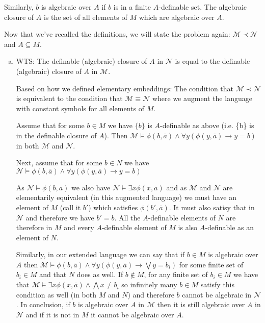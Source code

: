\documentclass[10pt]{article}
\newcommand{\A}{\forall}
\newcommand{\mcM}{\mathcal{M}}
\newcommand{\mcN}{\mathcal{N}}
\newcommand{\E}{\exists}
\begin{document}
\begin{enumerate}[1.]
Similarly, \(b\) is algebraic over \(A\) if \(b\) is in a finite \(A\)-definable set. 
The algebraic closure of \(A\) is the set of all elements of \(M\) which are algebraic over \(A\).

Now that we've recalled the definitions, we will state the problem again: 
\(\mcM \prec \mcN\) and \(A \subseteq M\).
\begin{enumerate}[a)]
  \item WTS: The definable (algebraic) closure of \(A\) in \(\mcN\) is equal to the definable (algebraic) closure of \(A\) in \(\mcM\).

  Based on how we defined elementary embeddings: The condition that \(\mcM \prec \mcN\) is equivalent to the condition that \(\mcM \equiv \mcN\) where we augment the language with constant symbols for all elements of \(M\). 

  Assume that for some \(b \in M\) we have \(\{b\}\) is \(A\)-definable as above (i.e. \{b\} is in the definable closure of \(A\)). 
Then \(\mcM \models \phi(b, \bar{a}) \land \A y (\phi(y, \bar{a}) \to y = b)\) in both \(\mcM\) and \(\mcN\). 

  Next, assume that for some \(b \in N\) we have \(\mcN \models \phi(b, \bar{a}) \land \A y (\phi(y, \bar{a}) \to y = b)\)

  As \(\mcN \models \phi(b, \bar{a})\) we also have \(\mcN \models \E x \phi(x, \bar{a})\) and as \(\mcM\) and \(\mcN\) are elementarily equivalent (in this augmented language) we must have an element of \(M\) (call it \(b'\)) which satisfies \(\phi(b', \bar{a})\). 
  It must also satisy that in \(\mcN\) and therefore we have \(b' = b\). 
  All the \(A\)-definable elements of \(N\) are therefore in \(M\) and every \(A\)-definable element of \(M\) is also \(A\)-definable as an element of \(N\).

  Similarly, in our extended language we can say that if \(b \in M\) is algebraic over \(A\) then \(\mcM \models \phi(b, \bar{a}) \land \A y (\phi(y, \bar{a}) \to \bigvee y = b_i)\) for some finite set of \(b_i \in M\) and that \(N\) does as well. 
  If \(b \notin M\), for any finite set of \(b_i \in M\) we have that \(\mcM \models \E x \phi(x, \bar{a}) \land \bigwedge x \neq b_i\) so infinitely many \(b \in M\) satisfy this condition as well (in both \(M\) and \(N\)) and therefore \(b\) cannot be algebraic in \(\mcN\). 
  In conclusion, if \(b\) is algebraic over \(A\) in \(\mcM\) then it is still algebraic over \(A\) in \(\mcN\) and if it is not in \(M\) it cannot be algebraic over \(A\). 


\end{enumerate}
\end{enumerate}
\end{document}

